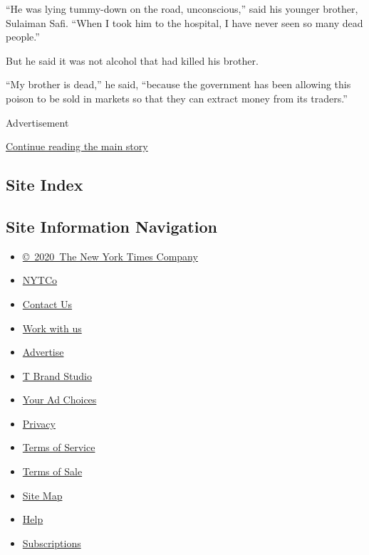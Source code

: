 ``He was lying tummy-down on the road, unconscious,'' said his younger
brother, Sulaiman Safi. ``When I took him to the hospital, I have never
seen so many dead people.''

But he said it was not alcohol that had killed his brother.

``My brother is dead,'' he said, ``because the government has been
allowing this poison to be sold in markets so that they can extract
money from its traders.''

Advertisement

\protect\hyperlink{after-bottom}{Continue reading the main story}

\hypertarget{site-index}{%
\subsection{Site Index}\label{site-index}}

\hypertarget{site-information-navigation}{%
\subsection{Site Information
Navigation}\label{site-information-navigation}}

\begin{itemize}
\tightlist
\item
  \href{https://help.nytimes.com/hc/en-us/articles/115014792127-Copyright-notice}{©~2020~The
  New York Times Company}
\end{itemize}

\begin{itemize}
\tightlist
\item
  \href{https://www.nytco.com/}{NYTCo}
\item
  \href{https://help.nytimes.com/hc/en-us/articles/115015385887-Contact-Us}{Contact
  Us}
\item
  \href{https://www.nytco.com/careers/}{Work with us}
\item
  \href{https://nytmediakit.com/}{Advertise}
\item
  \href{http://www.tbrandstudio.com/}{T Brand Studio}
\item
  \href{https://www.nytimes.com/privacy/cookie-policy\#how-do-i-manage-trackers}{Your
  Ad Choices}
\item
  \href{https://www.nytimes.com/privacy}{Privacy}
\item
  \href{https://help.nytimes.com/hc/en-us/articles/115014893428-Terms-of-service}{Terms
  of Service}
\item
  \href{https://help.nytimes.com/hc/en-us/articles/115014893968-Terms-of-sale}{Terms
  of Sale}
\item
  \href{https://spiderbites.nytimes.com}{Site Map}
\item
  \href{https://help.nytimes.com/hc/en-us}{Help}
\item
  \href{https://www.nytimes.com/subscription?campaignId=37WXW}{Subscriptions}
\end{itemize}

